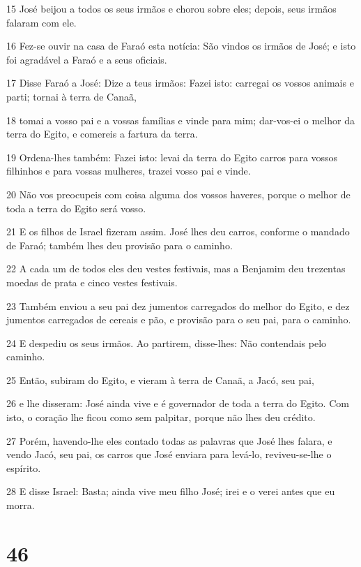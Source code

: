 \par 15 José beijou a todos os seus irmãos e chorou sobre eles; depois, seus irmãos falaram com ele.
\par 16 Fez-se ouvir na casa de Faraó esta notícia: São vindos os irmãos de José; e isto foi agradável a Faraó e a seus oficiais.
\par 17 Disse Faraó a José: Dize a teus irmãos: Fazei isto: carregai os vossos animais e parti; tornai à terra de Canaã,
\par 18 tomai a vosso pai e a vossas famílias e vinde para mim; dar-vos-ei o melhor da terra do Egito, e comereis a fartura da terra.
\par 19 Ordena-lhes também: Fazei isto: levai da terra do Egito carros para vossos filhinhos e para vossas mulheres, trazei vosso pai e vinde.
\par 20 Não vos preocupeis com coisa alguma dos vossos haveres, porque o melhor de toda a terra do Egito será vosso.
\par 21 E os filhos de Israel fizeram assim. José lhes deu carros, conforme o mandado de Faraó; também lhes deu provisão para o caminho.
\par 22 A cada um de todos eles deu vestes festivais, mas a Benjamim deu trezentas moedas de prata e cinco vestes festivais.
\par 23 Também enviou a seu pai dez jumentos carregados do melhor do Egito, e dez jumentos carregados de cereais e pão, e provisão para o seu pai, para o caminho.
\par 24 E despediu os seus irmãos. Ao partirem, disse-lhes: Não contendais pelo caminho.
\par 25 Então, subiram do Egito, e vieram à terra de Canaã, a Jacó, seu pai,
\par 26 e lhe disseram: José ainda vive e é governador de toda a terra do Egito. Com isto, o coração lhe ficou como sem palpitar, porque não lhes deu crédito.
\par 27 Porém, havendo-lhe eles contado todas as palavras que José lhes falara, e vendo Jacó, seu pai, os carros que José enviara para levá-lo, reviveu-se-lhe o espírito.
\par 28 E disse Israel: Basta; ainda vive meu filho José; irei e o verei antes que eu morra.

\chapter{46}

